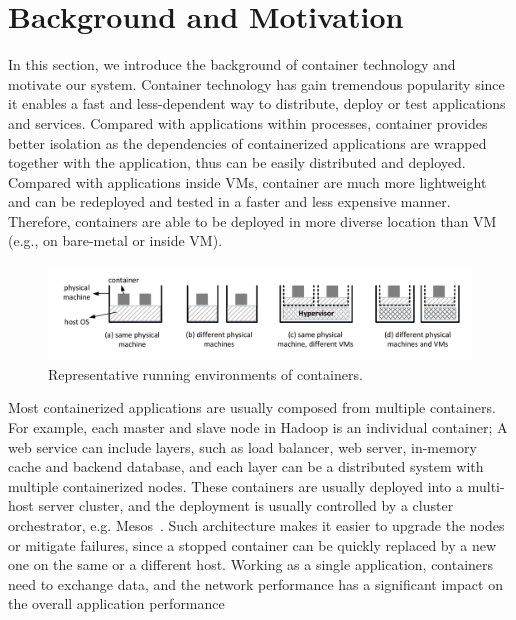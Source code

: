 \section{Background and Motivation}
\label{sec:motivation}

In this section, we introduce the background of container technology and
motivate our system.  Container technology has gain tremendous popularity since
it enables a fast and less-dependent way to distribute, deploy or test
applications and services.  Compared with applications within processes,
container provides better isolation as the dependencies of containerized
applications are wrapped together with the application, thus can be easily
distributed and deployed.  Compared with applications inside VMs, container are
much more lightweight and can be redeployed and tested in a faster and less
expensive manner. Therefore, containers are able to be deployed in more diverse
location than VM (e.g., on bare-metal or inside VM). 
\begin{figure}  
	\centering   
	\includegraphics[width=6.7in]{figures/deployment-cases}   
	\caption{\label{fig:deploy-cases} Representative running environments of containers.}   
\end{figure}

Most containerized applications are usually composed from multiple containers. For
example, each master and slave node in Hadoop is an individual container; A web
service can include layers, such as load balancer, web server, in-memory cache
and backend database, and each layer can be a distributed system with multiple
containerized nodes. These containers are usually deployed into a multi-host
server cluster, and the deployment is usually controlled by a cluster
orchestrator, e.g. Mesos~\cite{xxx}.  Such architecture makes it easier to
upgrade the nodes or mitigate failures, since a stopped container can be quickly
replaced by a new one on the same or a different host.  Working as a single
application, containers need to exchange data, and the network performance has a
significant impact on the overall application performance~\cite{coflow-etc.}

